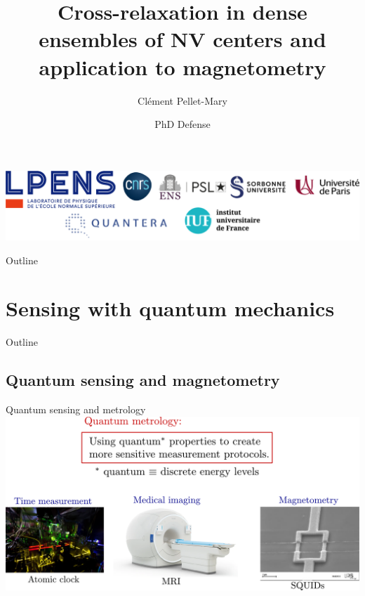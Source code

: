 \documentclass{beamer}
\title[PhD Defense]{Cross-relaxation in dense ensembles of NV centers and
application to magnetometry}
\author{Clément Pellet-Mary}
\date{PhD Defense}
\begin{document}
\begin{frame}
\maketitle
\begin{center}
\includegraphics[width=\textwidth,height=0.3\textheight,keepaspectratio]{logos}
\end{center}
\end{frame}

\begin{frame}{Outline}
\tableofcontents
\end{frame}

\section{Sensing with quantum mechanics}
\begin{frame}{Outline}
\tableofcontents[currentsection]
\end{frame}

\subsection{Quantum sensing and magnetometry}
\begin{frame}{Quantum sensing and metrology}
\centering
\includegraphics[width=\textwidth,height=0.85\textheight,keepaspectratio]{Slide_quantum_metrology}
\end{frame}
\end{document}
